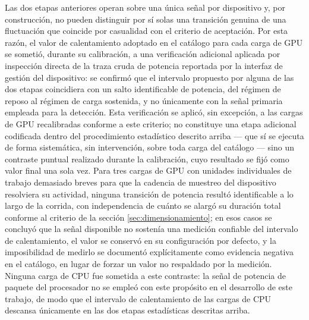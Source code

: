 \documentclass[12pt,oneside,spanish]{book}
\begin{document}
Las dos etapas anteriores operan sobre una única señal por dispositivo y, por construcción, no pueden distinguir por sí solas una transición genuina de una fluctuación que coincide por casualidad con el criterio de aceptación. Por esta razón, el valor de calentamiento adoptado en el catálogo para cada carga de GPU se sometió, durante su calibración, a una verificación adicional aplicada por inspección directa de la traza cruda de potencia reportada por la interfaz de gestión del dispositivo: se confirmó que el intervalo propuesto por alguna de las dos etapas coincidiera con un salto identificable de potencia, del régimen de reposo al régimen de carga sostenida, y no únicamente con la señal primaria empleada para la detección. Esta verificación se aplicó, sin excepción, a las cargas de GPU recalibradas conforme a este criterio; no constituye una etapa adicional codificada dentro del procedimiento estadístico descrito arriba --- que sí se ejecuta de forma sistemática, sin intervención, sobre toda carga del catálogo --- sino un contraste puntual realizado durante la calibración, cuyo resultado se fijó como valor final una sola vez. Para tres cargas de GPU con unidades individuales de trabajo demasiado breves para que la cadencia de muestreo del dispositivo resolviera su actividad, ninguna transición de potencia resultó identificable a lo largo de la corrida, con independencia de cuánto se alargó su duración total conforme al criterio de la sección \ref{sec:dimensionamiento}; en esos casos se concluyó que la señal disponible no sostenía una medición confiable del intervalo de calentamiento, el valor se conservó en su configuración por defecto, y la imposibilidad de medirlo se documentó explícitamente como evidencia negativa en el catálogo, en lugar de forzar un valor no respaldado por la medición. Ninguna carga de CPU fue sometida a este contraste: la señal de potencia de paquete del procesador no se empleó con este propósito en el desarrollo de este trabajo, de modo que el intervalo de calentamiento de las cargas de CPU descansa únicamente en las dos etapas estadísticas descritas arriba.
\end{document}
